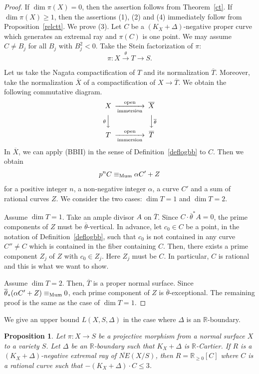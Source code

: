 \documentclass[12pt,twoside]{amsart}
\newtheorem{prop}[thm]{Proposition}
\theoremstyle{definition}
\begin{document}
\begin{proof}
If $\dim \pi(X)=0$, then the assertion follows from Theorem~\ref{ct}. 
If $\dim \pi(X) \geq 1$, then 
the assertions (1), (2) and (4) 
immediately follow from Proposition~\ref{relctt}. 
We prove (3). 
Let $C$ be a $(K_X+\Delta)$-negative proper curve which 
generates an extremal ray and $\pi(C)$ is one point. 
We may assume $C\neq B_j$ for all $B_j$ with $B_j^2<0$. 
Take the Stein factorization of $\pi$: 
$$\pi:X\overset{\theta}\to T\to S.$$ 

Let us take the Nagata compactification of $T$ and 
its normalization $\overline{T}$. 
Moreover, take the normalization $\overline{X}$ 
of a compactification of $X \to \overline{T}$. 
We obtain the following commutative diagram. 
$$
\begin{CD}
X @>{\rm open}>{\rm immersion}> \overline{X}\\
@V\theta VV @VV\overline{\theta}V\\
T @>{\rm open}>{\rm immersion}> \overline{T}\\
\end{CD}
$$
In $\overline{X}$, we can apply 
(BBII) in the sense of Definition~\ref{deflogbb} to $C$. 
Then we obtain 
$$p^nC\equiv_{\rm Mum} \alpha C'+Z$$
for a positive integer $n$, 
a non-negative integer $\alpha$, 
a curve $C'$ and a sum of rational curves $Z$. 
We consider the two cases: $\dim T=1$ and $\dim T=2$. 

Assume $\dim T=1$. 
Take an ample divisor $A$ on $\overline{T}$. 
Since $C\cdot \overline{\theta}^*A=0$, 
the prime components of $Z$ must be $\overline{\theta}$-vertical. 
In advance, let $c_0\in C$ be a point, 
in the notation of Definition~\ref{deflogbb}, such that 
$c_0$ is not contained in any curve $C''\neq C$
which is contained in the fiber containing $C$. 
Then, there exists a prime component $Z_j$ of $Z$ with $c_0\in Z_j$. 
Here $Z_j$ must be $C$. 
In particular, $C$ is rational and 
this is what we want to show. 

Assume $\dim T=2$. 
Then, $\overline{T}$ is a proper normal surface. 
Since $\overline{\theta}_*(\alpha C'+Z)\equiv_{\rm Mum}0$, 
each prime component of $Z$ is $\overline{\theta}$-exceptional. 
The remaining proof is the same as the case of $\dim T=1$.
\end{proof}

We give an upper bound $L(X, S, \Delta)$ 
in the case where $\Delta$ is an $\mathbb{R}$-boundary. 

\begin{prop}\label{ext-rat-length2}
Let $\pi:X \to S$ be a projective morphism 
from a normal surface $X$ to a variety $S$.
Let $\Delta$ be an $\mathbb{R}$-boundary such that $K_X+\Delta$ is $\mathbb{R}$-Cartier. 
If $R$ is a $(K_X+\Delta)$-negative extremal ray of $\overline{NE}(X/S)$, 
then $R=\mathbb R_{\geq 0}[C]$ where $C$ is a rational curve such that 
$-(K_X+\Delta)\cdot C\leq 3$.
\end{prop}
\end{document}

